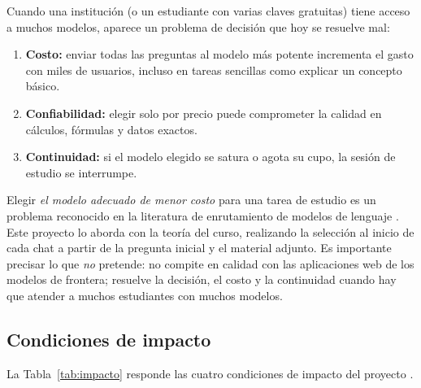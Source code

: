 \documentclass[12pt,letterpaper]{article}
\begin{document}
Cuando una institución (o un estudiante con varias claves gratuitas) tiene acceso a muchos modelos, aparece un problema de decisión que hoy se resuelve mal:
\begin{enumerate}[nosep]
  \item \textbf{Costo:} enviar todas las preguntas al modelo más potente incrementa el gasto con miles de usuarios, incluso en tareas sencillas como explicar un concepto básico.
  \item \textbf{Confiabilidad:} elegir solo por precio puede comprometer la calidad en cálculos, fórmulas y datos exactos.
  \item \textbf{Continuidad:} si el modelo elegido se satura o agota su cupo, la sesión de estudio se interrumpe.
\end{enumerate}
Elegir \emph{el modelo adecuado de menor costo} para una tarea de estudio es un problema reconocido en la literatura de enrutamiento de modelos de lenguaje \parencite{ong2024routellm}. Este proyecto lo aborda con la teoría del curso, realizando la selección al inicio de cada chat a partir de la pregunta inicial y el material adjunto. Es importante precisar lo que \emph{no} pretende: no compite en calidad con las aplicaciones web de los modelos de frontera; resuelve la decisión, el costo y la continuidad cuando hay que atender a muchos estudiantes con muchos modelos.

\subsection{Condiciones de impacto}
La Tabla~\ref{tab:impacto} responde las cuatro condiciones de impacto del proyecto \parencite{gomez2026proyecto}.
\end{document}
